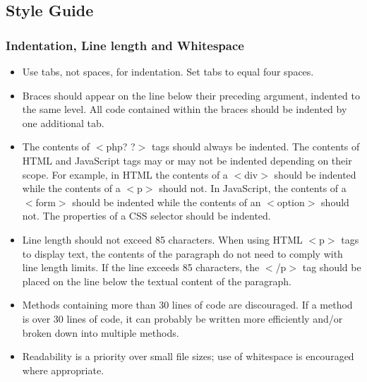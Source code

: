 %

	\subsection{Style Guide}
	
		\subsubsection{Indentation, Line length and Whitespace}
		\begin{itemize}
			\item Use tabs, not spaces, for indentation. Set tabs to equal four spaces.
			\item Braces should appear on the line below their preceding argument, indented to the same level. All code contained within the braces should be indented by one additional tab.
			\item The contents of $<$php? ?$>$ tags should always be indented. The contents of HTML and JavaScript tags may or may not be indented depending on their scope. For example, in HTML the contents of a $<$div$>$ should be indented while the contents of a $<$p$>$ should not. In JavaScript, the contents of a $<$form$>$ should be indented while the contents of an $<$option$>$ should not. The properties of a CSS selector should be indented.
			\item Line length should not exceed 85 characters. When using HTML $<$p$>$ tags to display text, the contents of the paragraph do not need to comply with line length limits. If the line exceeds 85 characters, the $<$/p$>$ tag should be placed on the line below the textual content of the paragraph.
			\item Methods containing more than 30 lines of code are discouraged. If a method is over 30 lines of code, it can probably be written more efficiently and/or broken down into multiple methods.
			\item Readability is a priority over small file sizes; use of whitespace is encouraged where appropriate.
		\end{itemize}
			
